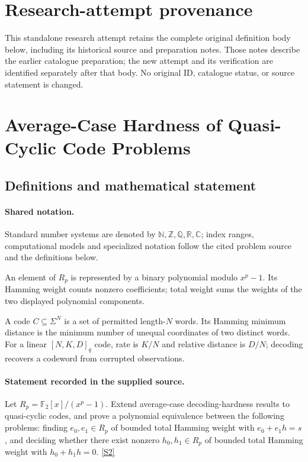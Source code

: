 \documentclass[11pt]{article}
\begin{document}
\section*{Research-attempt provenance}
This standalone research attempt retains the complete original definition body below,
including its historical source and preparation notes. Those notes describe the
earlier catalogue preparation; the new attempt and its verification are identified
separately after that body. No original ID, catalogue status, or source statement is changed.

\section{Average-Case Hardness of Quasi-Cyclic Code Problems}\label{statement}

\subsection{Definitions and mathematical statement}

\paragraph{Shared notation.}Standard number systems are denoted by $\mathbb N,\mathbb Z,\mathbb Q,\mathbb R,\mathbb C$; index ranges, computational models and specialized notation follow the cited problem source and the definitions below.


An element of $R_p$ is represented by a binary polynomial modulo $x^p-1$. Its Hamming weight counts nonzero coefficients; total weight sums the weights of the two displayed polynomial components.

A code $C\subseteq\Sigma^N$ is a set of permitted length-$N$ words. Its Hamming minimum distance is the minimum number of unequal coordinates of two distinct words. For a linear $[N,K,D]_q$ code, rate is $K/N$ and relative distance is $D/N$; decoding recovers a codeword from corrupted observations.
\paragraph{Statement recorded in the supplied source.}
Let $R_p=\mathbb F_2[x]/(x^p-1)$. Extend average-case decoding-hardness results to quasi-cyclic codes, and prove a polynomial equivalence between the following problems: finding $e_0,e_1\in R_p$ of bounded total Hamming weight with $e_0+e_1h=s$, and deciding whether there exist nonzero $h_0,h_1\in R_p$ of bounded total Hamming weight with $h_0+h_1h=0$. \href{https://doi.org/10.4171/owr/2017/5}{[S2]}
\end{document}
